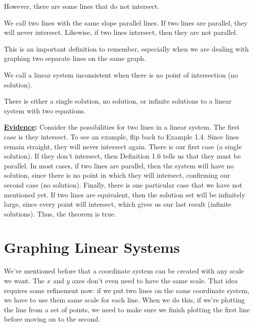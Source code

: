 However, there are some lines that do not intersect.

\begin{defn}
We call two lines with the same slope parallel lines. If two lines are parallel, they will never intersect. Likewise, if two lines intersect, then they are not parallel. 	
\end{defn}
This is an important definition to remember, especially when we are dealing with graphing two separate lines on the same graph.

\begin{defn}
We call a linear system inconsistent when there is no point of intersection (no solution).	
\end{defn}

\begin{theorem}
There is either a single solution, no solution, or infinite solutions to a linear system with two equations. 	
\end{theorem}

\noindent
\textbf{\underline{Evidence}:} Consider the possibilities for two lines in a linear system. The first case is they intersect. To see an example, flip back to Example 1.4. Since lines remain straight, they will never intersect again. There is our first case (a single solution). If they don't intersect, then Definition 1.6 tells us that they must be parallel. In most cases, if two lines are parallel, then the system will have no solution, since there is no point in which they will intersect, confirming our second case (no solution). Finally, there is one particular case that we have not mentioned yet. If two lines are equivalent, then the solution set will be infinitely large, since every point will intersect, which gives us our last result (infinite solutions). Thus, the theorem is true. 
\pagebreak

\section{Graphing Linear Systems}

We've mentioned before that a coordinate system can be created with any scale we want.  The $x$ and $y$ axes don't even need to have the same scale.  That idea requires some refinement now: if we put two lines on the same coordinate system, we have to use them same scale for each line.  When we do this, if we're plotting the line from a set of points, we need to make sure we finish plotting the first line before moving on to the second.

